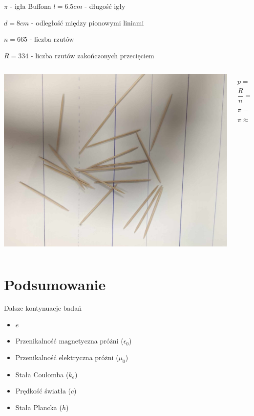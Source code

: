 \documentclass{beamer}
\begin{document}
\begin{frame}{$\pi$ - igła Buffona}
	$l=6.5cm$ - długość igły \pause

	$d=8cm$ - odległość między pionowymi liniami \pause

	$n=665$ - liczba rzutów \pause

	$R=334$ - liczba rzutów zakończonych przecięciem \pause

\begin{columns}
\begin{column}{0.5\textwidth}
	\includegraphics[width=\linewidth]{Buffon.jpg}
\end{column}

\begin{column}{0.5\textwidth}
	$$p = \frac{2}{\pi} \frac{l}{d}$$ \pause
	$$\frac{R}{n} = \frac{2}{\pi}\frac{l}{d}$$ \pause
	$$\pi = \frac{2 l n}{d R}$$ \pause
	$$\pi \approx 3.141$$ \pause
\end{column}

\end{columns}

\end{frame}


\section{Podsumowanie}

\begin{frame}{Dalsze kontynuacje badań}
	\begin{itemize}
		\item $e$
		\item Przenikalność magnetyczna próżni ($\epsilon_0$)
		\item Przenikalność elektryczna próżni ($\mu_0$)
		\item Stała Coulomba ($k_e$)
		\item Prędkość światła ($c$)
		\item Stała Plancka ($h$)
	\end{itemize}

\end{frame}
\end{document}

